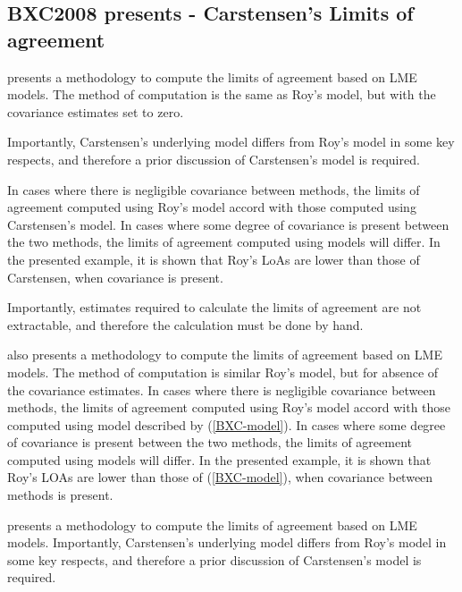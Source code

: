 \documentclass[12pt, a4paper]{report}
\theoremstyle{plain}
\theoremstyle{definition}
\theoremstyle{remark}
\begin{document}
	
	
	
	

\subsection{BXC2008 presents - Carstensen's Limits of agreement}
\citet{BXC2008} presents a methodology to compute the limits of agreement based on LME models. The method of computation is the same as Roy's model, but with the covariance estimates set to zero.

Importantly, Carstensen's underlying model differs from Roy's model in some key respects, and therefore a prior discussion of Carstensen's model is required.

In cases where there is negligible covariance between methods, the limits of agreement computed using Roy's model accord with those computed using Carstensen's model. In cases where some degree of
covariance is present between the two methods, the limits of agreement computed using models will differ. In the presented example, it is shown that Roy's LoAs are lower than those of Carstensen, when covariance is present.

Importantly, estimates required to calculate the limits of agreement are not extractable, and therefore the calculation must be done by hand.



\citet{BXC2008} also presents a methodology to compute the limits of agreement based on LME models. The method of computation is similar Roy's model, but for absence of the covariance estimates. In cases where there is negligible covariance between methods, the limits of agreement computed using Roy's model accord with those computed using model described by (\ref{BXC-model}). In cases where some degree of covariance is present between the two methods, the limits of agreement computed using models will differ. In the presented example, it is shown that Roy's LOAs are lower than those of (\ref{BXC-model}), when covariance between methods is present.

\citet{BXC2008} presents a methodology to compute the limits of
agreement based on LME models. Importantly, Carstensen's underlying model differs from Roy's model in some key respects, and therefore a prior discussion of Carstensen's model is required.
\end{document}
